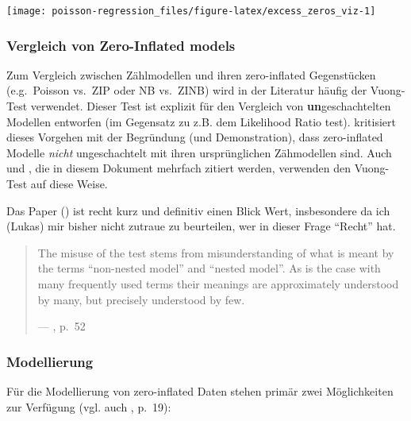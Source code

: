 \documentclass[ngerman,a4paper,]{scrartcl}
\theoremstyle{definition}
\theoremstyle{definition}
\theoremstyle{definition}
\theoremstyle{remark}
\begin{document}
\begin{center}\texttt{[image: poisson-regression\_files/figure-latex/excess\_zeros\_viz-1]} \end{center}

\hypertarget{vergleich-von-zero-inflated-models}{%
\subsubsection*{Vergleich von Zero-Inflated models}\label{vergleich-von-zero-inflated-models}}

Zum Vergleich zwischen Zählmodellen und ihren zero-inflated Gegenstücken (e.g.~Poisson vs.~ZIP oder NB vs.~ZINB) wird in der Literatur häufig der Vuong-Test \citep{vuongLikelihoodRatioTests1989, desmarais2013TestingZero} verwendet. Dieser Test ist explizit für den Vergleich von \textbf{un}geschachtelten Modellen entworfen (im Gegensatz zu z.B. dem Likelihood Ratio test). \citet{wilson2015MisuseVuong} kritisiert dieses Vorgehen mit der Begründung (und Demonstration), dass zero-inflated Modelle \emph{nicht} ungeschachtelt mit ihren ursprünglichen Zähmodellen sind. Auch \citet{perumean-chaneyZeroinflatedOverdispersedWhat2013} und \citet{hilbeModelingCountData2014}, die in diesem Dokument mehrfach zitiert werden, verwenden den Vuong-Test auf diese Weise.

Das Paper (\citet{wilson2015MisuseVuong}) ist recht kurz und definitiv einen Blick Wert, insbesondere da ich (Lukas) mir bisher nicht zutraue zu beurteilen, wer in dieser Frage \enquote{Recht} hat.

\begin{quote}
The misuse of the test stems from misunderstanding of what is meant by the terms \enquote{non-nested model} and \enquote{nested model}. As is the case with many frequently used terms their meanings are approximately understood by many, but precisely understood by few.

--- \citet{wilson2015MisuseVuong}, p.~52
\end{quote}

\hypertarget{modellierung}{%
\subsubsection*{Modellierung}\label{modellierung}}

Für die Modellierung von zero-inflated Daten stehen primär zwei Möglichkeiten zur Verfügung (vgl. auch \citet{hilbeModelingCountData2014}, p.~19):
\end{document}
